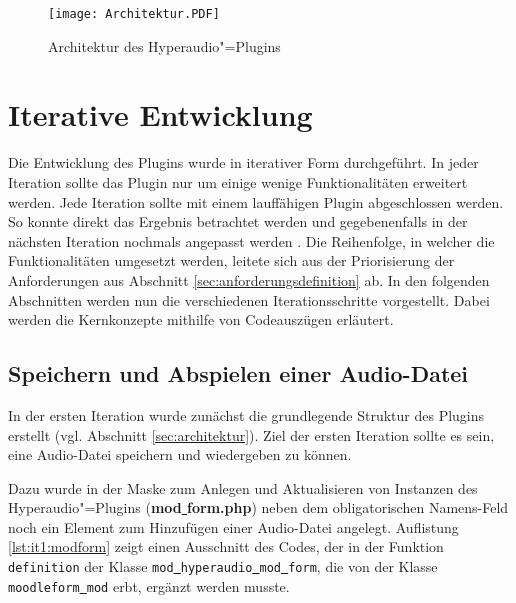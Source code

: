 \begin{figure}[h!]
\texttt{[image: Architektur.PDF]}
\caption{\label{fig:Architektur}Architektur des Hyperaudio"=Plugins}
\end{figure} 

\section{Iterative Entwicklung}
Die Entwicklung des Plugins wurde in iterativer Form durchgeführt. In jeder Iteration sollte das Plugin nur um einige wenige Funktionalitäten erweitert werden. Jede Iteration sollte mit einem lauffähigen Plugin abgeschlossen werden. So konnte direkt das Ergebnis betrachtet werden und gegebenenfalls in der nächsten Iteration nochmals angepasst werden \citep{augsten2018iterativ}. Die Reihenfolge, in welcher die Funktionalitäten umgesetzt werden, leitete sich aus der Priorisierung der Anforderungen aus Abschnitt \ref{sec:anforderungsdefinition} ab. In den folgenden Abschnitten werden nun die verschiedenen Iterationsschritte vorgestellt. Dabei werden die Kernkonzepte mithilfe von Codeauszügen erläutert.

\subsection{Speichern und Abspielen einer Audio-Datei}
\label{sec:it1}
In der ersten Iteration wurde zunächst die grundlegende Struktur des Plugins erstellt (vgl. Abschnitt \ref{sec:architektur}). Ziel der ersten Iteration sollte es sein, eine Audio-Datei speichern und wiedergeben zu können.

Dazu wurde in der Maske zum Anlegen und Aktualisieren von Instanzen des Hyperaudio"=Plugins (\textbf{mod\underline{{ }}form.php}) neben dem obligatorischen Namens-Feld noch ein Element zum Hinzufügen einer Audio-Datei angelegt. Auflistung \ref{lst:it1:modform} zeigt einen Ausschnitt des Codes, der in der Funktion \texttt{definition} der Klasse \texttt{mod\underline{{ }}hyperaudio\underline{{ }}mod\underline{{ }}form}, die von der Klasse \texttt{moodleform\underline{{ }}mod} erbt, ergänzt werden musste. 

